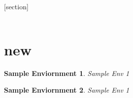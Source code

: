     [section]
    \thefoo \\  %
    \thefoo \\  %
    \section{new}   %
    \thefoo         %
    \thefoo %

    \newtheorem{SampleEnv}{Sample Enviornment}[section] %

    \begin{SampleEnv}
        Sample Env 1
    \end{SampleEnv}
    \begin{SampleEnv}
        Sample Env 1
    \end{SampleEnv}
    




%           
%           
%           
%           
%           
% 
%
%
% 
%
%
% 
%
%
% 
%
%
% 
%
%
% 
%
%
% 
